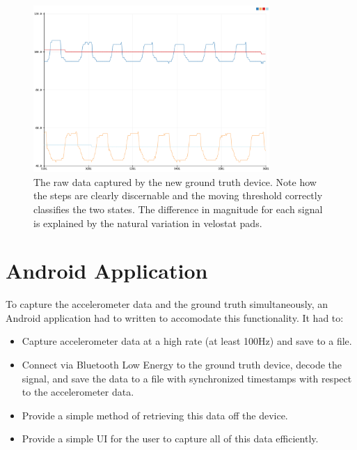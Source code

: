             \begin{figure}[!th]
                \includegraphics[width=0.8\textwidth]{Images/device_new_graph.png}
                \centering
                \caption{The raw data captured by the new ground truth device. Note how the steps are clearly discernable and the moving threshold correctly classifies the two states. The difference in magnitude for each signal is explained by the natural variation in velostat pads.}
                \label{img_device_new_graph}
            \end{figure}         


        \section{Android Application}

            To capture the accelerometer data and the ground truth simultaneously, an Android application had to written to accomodate this functionality. It had to:

            \begin{itemize}
                \item Capture accelerometer data at a high rate (at least 100Hz) and save to a file.
                \item Connect via Bluetooth Low Energy to the ground truth device, decode the signal, and save the data to a file with synchronized timestamps with respect to the accelerometer data.
                \item Provide a simple method of retrieving this data off the device.
                \item Provide a simple UI for the user to capture all of this data efficiently.
            \end{itemize}

